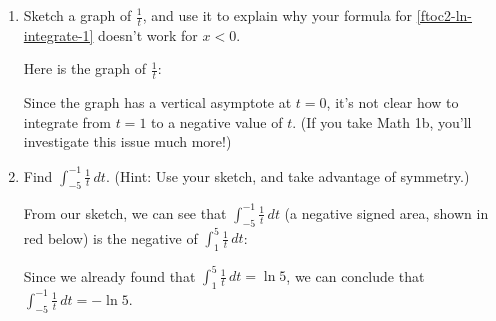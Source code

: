 \documentclass{article}
\begin{document}
\begin{enumerate}
\begin{enumerate}
  \item
    \begin{problem}
      Sketch a graph of $\frac{1}{t}$, and use it to explain why your
      formula for \ref{ftoc2-ln-integrate-1} doesn't work for $x < 0$. 
    \end{problem}

    \begin{solution}
      Here is the graph of $\frac{1}{t}$:
      \begin{center}
      \end{center}
      Since the graph has a vertical asymptote at $t = 0$, it's not clear
      how to integrate from $t = 1$ to a negative value of $t$.  (If you
      take Math 1b, you'll investigate this issue much more!)
    \end{solution}

  \item
    \begin{problem}
      Find $\displaystyle \int_{-5}^{-1} \frac{1}{t}\,dt$.  (Hint: Use
      your sketch, and take advantage of symmetry.)
    \end{problem}
    \pspace{\vfill}

    \begin{solution}
      From our sketch, we can see that $\displaystyle \int_{-5}^{-1}
      \frac{1}{t}\,dt$ (a negative signed area, shown in red below) is the
      negative of $\displaystyle \int_1^5 \frac{1}{t}\,dt$:
      \begin{center}
      \end{center}
      Since we already found that $\displaystyle \int_1^5 \frac{1}{t}\,dt
      = \ln 5$, we can conclude that $\displaystyle \int_{-5}^{-1}
      \frac{1}{t}\,dt = \boxed{-\ln 5}$.
    \end{solution}


\end{enumerate}
\end{enumerate}
\end{document}
